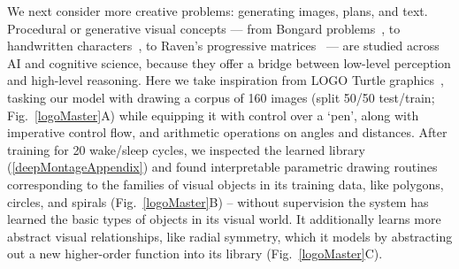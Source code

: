 \documentclass[12pt]{article}
\begin{document}



  We next consider more creative problems: generating images, plans, and text. Procedural or generative visual concepts 
--- from Bongard problems~\cite{Moscow}, to handwritten characters~\cite{lake2015human,hofstadter1993letter}, to Raven's progressive
matrices~\cite{raven2003raven} --- are studied across AI and cognitive science, because they offer a bridge between low-level perception and high-level reasoning. Here we take
inspiration from LOGO Turtle graphics~\cite{turtle}, tasking our model
with drawing a corpus of 160 images (split 50/50 test/train; Fig.~\ref{logoMaster}A) while equipping it with control
over a `pen', along with imperative control flow, and arithmetic operations on angles and
distances.
After training \system for 20 wake/sleep cycles, we inspected the learned library (\ref{deepMontageAppendix}) and found interpretable parametric drawing
routines corresponding to the families of visual objects in its
training data, like polygons, circles, and spirals
(Fig.~\ref{logoMaster}B) -- without supervision the system %
has learned the basic types of objects in its visual world. It
additionally learns more abstract visual relationships, like
radial symmetry, which it models by abstracting out a new higher-order
function into its library (Fig.~\ref{logoMaster}C).
\end{document}
